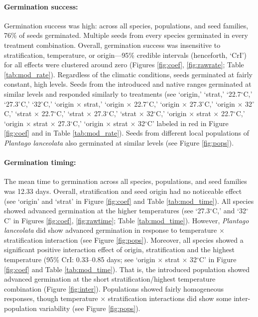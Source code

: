 \documentclass[11pt]{article}\usepackage[]{graphicx}\usepackage[]{color}
\begin{document}
	\paragraph{Germination success:} Germination success was high: across all species, populations, and seed families, 76\% of seeds germinated. Multiple seeds from every species germinated in every treatment combination. Overall, germination success was insensitive to stratification, temperature, or origin---95\% credible intervals (henceforth, `CrI') for all effects were clustered around zero (Figures \ref{fig:coef}, \ref{fig:rawrate}; Table \ref{tab:mod_rate}). Regardless of the climatic conditions, seeds germinated at fairly constant, high levels. Seeds from the introduced and native ranges germinated at similar levels and responded similarly to treatments (see `origin,' `strat,' `22.7$^{\circ}$C,' `27.3$^{\circ}$C,' `32$^{\circ}$C,' `origin $\times$ strat,' `origin $\times$ 22.7$^{\circ}$C,' `origin $\times$ 27.3$^{\circ}$C,' `origin $\times$ 32$^{\circ}$C,' `strat $\times$ 22.7$^{\circ}$C,' `strat $\times$ 27.3$^{\circ}$C,' `strat $\times$ 32$^{\circ}$C,' `origin $\times$ strat $\times$ 22.7$^{\circ}$C,' `origin $\times$ strat $\times$ 27.3$^{\circ}$C,' `origin $\times$ strat $\times$ 32$^{\circ}$C' labeled in red in Figure \ref{fig:coef} and in Table \ref{tab:mod_rate}). Seeds from different local populations of \textit{Plantago lanceolata} also germinated at similar levels (see Figure \ref{fig:pops}).
	\paragraph{Germination timing:} The mean time to germination across all species, populations, and seed families was 12.33 days. Overall, stratification and seed origin had no noticeable effect (see `origin' and `strat' in Figure \ref{fig:coef} and Table \ref{tab:mod_time}). All species showed advanced germination at the higher temperatures (see `27.3$^{\circ}$C,' and `32$^{\circ}$C' in Figures \ref{fig:coef}, \ref{fig:rawtime}; Table \ref{tab:mod_time}). However, \textit{Plantago lanceolata} did show advanced germination in response to temperature $\times$ stratification interaction (see Figure \ref{fig:pops}). Moreover, all species showed a significant positive interaction effect of origin, stratification and the highest temperature (95\% CrI: 0.33--0.85 days; see `origin $\times$ strat $\times$ 32$^{\circ}$C' in Figure \ref{fig:coef} and Table \ref{tab:mod_time}). That is, the introduced population showed advanced germination at the short stratification/highest temperature combination (Figure \ref{fig:inter}). Populations showed fairly homogeneous responses, though temperature $\times$ stratification interactions did show some inter-population variability (see Figure \ref{fig:pops}). 
\end{document}
